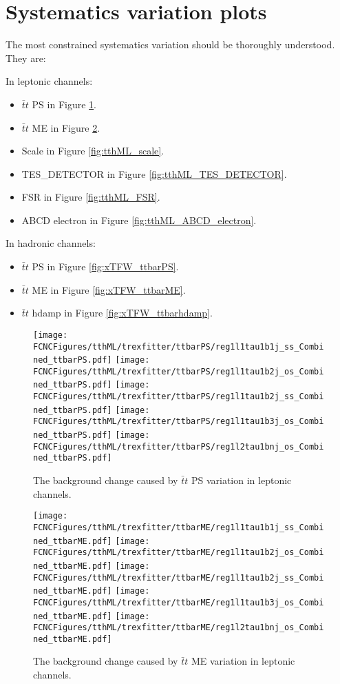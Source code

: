\section{Systematics variation plots}
\label{sec:sys_variation}

The most constrained systematics variation should be thoroughly understood. They are:

In leptonic channels:
\begin{itemize}
	\item $\bar{t}t$ PS in Figure \ref{fig:tthML_ttbarPS}.
	\item $\bar{t}t$ ME in Figure \ref{fig:tthML_ttbarME}.
	\item Scale in Figure \ref{fig:tthML_scale}.
	\item TES\_DETECTOR in Figure \ref{fig:tthML_TES_DETECTOR}.
	\item FSR in Figure \ref{fig:tthML_FSR}.
	\item ABCD electron in Figure \ref{fig:tthML_ABCD_electron}.
\end{itemize}

In hadronic channels:
\begin{itemize}
	\item $\bar{t}t$ PS in Figure \ref{fig:xTFW_ttbarPS}.
	\item $\bar{t}t$ ME in Figure \ref{fig:xTFW_ttbarME}.
	\item $\bar{t}t$ hdamp in Figure \ref{fig:xTFW_ttbarhdamp}.
\end{itemize}

\begin{figure}[H]
\centering
\texttt{[image: \\FCNCFigures/tthML/trexfitter/ttbarPS/reg1l1tau1b1j\_ss\_Combined\_ttbarPS.pdf]}
\texttt{[image: \\FCNCFigures/tthML/trexfitter/ttbarPS/reg1l1tau1b2j\_os\_Combined\_ttbarPS.pdf]}
\texttt{[image: \\FCNCFigures/tthML/trexfitter/ttbarPS/reg1l1tau1b2j\_ss\_Combined\_ttbarPS.pdf]}
\texttt{[image: \\FCNCFigures/tthML/trexfitter/ttbarPS/reg1l1tau1b3j\_os\_Combined\_ttbarPS.pdf]}
\texttt{[image: \\FCNCFigures/tthML/trexfitter/ttbarPS/reg1l2tau1bnj\_os\_Combined\_ttbarPS.pdf]}
\caption{The background change caused by $\bar{t}t$ PS variation in leptonic channels.}
\label{fig:tthML_ttbarPS}
\end{figure}

\begin{figure}[H]
\centering
\texttt{[image: \\FCNCFigures/tthML/trexfitter/ttbarME/reg1l1tau1b1j\_ss\_Combined\_ttbarME.pdf]}
\texttt{[image: \\FCNCFigures/tthML/trexfitter/ttbarME/reg1l1tau1b2j\_os\_Combined\_ttbarME.pdf]}
\texttt{[image: \\FCNCFigures/tthML/trexfitter/ttbarME/reg1l1tau1b2j\_ss\_Combined\_ttbarME.pdf]}
\texttt{[image: \\FCNCFigures/tthML/trexfitter/ttbarME/reg1l1tau1b3j\_os\_Combined\_ttbarME.pdf]}
\texttt{[image: \\FCNCFigures/tthML/trexfitter/ttbarME/reg1l2tau1bnj\_os\_Combined\_ttbarME.pdf]}
\caption{The background change caused by $\bar{t}t$ ME variation in leptonic channels.}
\label{fig:tthML_ttbarME}
\end{figure}

